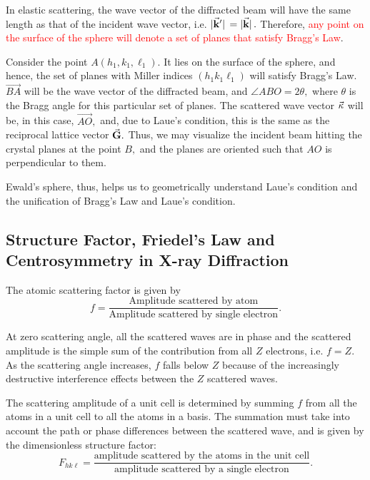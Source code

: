 	In elastic scattering, the wave vector of the diffracted beam will have the same length as that of the incident wave vector, i.e. $\abs*{\va{k}'} = \abs*{\va{k}}.$  Therefore, \textcolor{red}{any point on the surface of the sphere will denote a set of planes that satisfy Bragg's Law}.
	
	Consider the point $A(h_1, k_1, \ell_1).$ It lies on the surface of the sphere, and hence, the set of planes with Miller indices $(h_1 k_1 \ell_1)$ will satisfy Bragg's Law. $\overrightarrow{BA}$ will be the wave vector of the diffracted beam, and $\angle ABO = 2\theta,$ where $\theta$ is the Bragg angle for this particular set of planes. The scattered wave vector $\va{\kappa}$ will be, in this case, $\overrightarrow{AO},$ and, due to Laue's condition, this is the same as the reciprocal lattice vector $\va{G}.$ Thus, we may visualize the incident beam hitting the crystal planes at the point $B,$ and the planes are oriented such that $AO$ is perpendicular to them.
	
	Ewald's sphere, thus, helps us to geometrically understand Laue's condition and the unification of Bragg's Law and Laue's condition.
	

\subsection{Structure Factor, Friedel's Law and Centrosymmetry in X-ray Diffraction}

	The atomic scattering factor is given by%
%	
	\begin{equation}
	f = \dfrac{\text{Amplitude scattered by atom}}{\text{Amplitude scattered by single electron}}.
	\end{equation}
	
	At zero scattering angle, all the scattered waves are in phase and the scattered amplitude is the simple sum of the contribution from all $Z$ electrons, i.e. $f = Z$. As the scattering angle increases, $f$ falls below $Z$ because of the increasingly destructive interference effects between the $Z$ scattered waves.

	The scattering amplitude of a unit cell is determined by summing $f$ from all the atoms in a unit cell to all the atoms in a basis. The summation must take into account the path or phase differences between the scattered wave, and is given by the dimensionless structure factor:%
%	
	\begin{equation}
	F_{hk\ell} = \dfrac{\text{amplitude scattered by the atoms in the unit cell}}{\text{amplitude scattered by a single electron}}.
	\end{equation}
	
